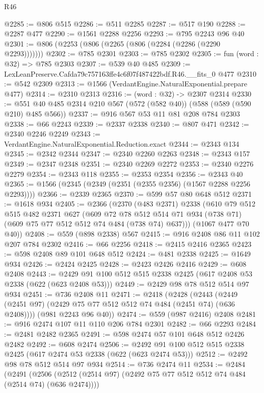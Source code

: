 \begin{lexlean}{R46}
\begin{coremodule}
@2285 := @806 @515
@2286 := @511 @2285
@2287 := @517 @190
@2288 := @2287 @477
@2290 := @1561 @2288 @2256
@2293 := @795 @2243 @96 @40
@2301 := @806 (@2253 (@806 (@2265 (@806 (@2284 (@2286 (@2290 @2293)))))))
@2302 := @785 @2301
@2303 := @785 @2302
@2305 := fun (word : @32) => @785 @2303
@2307 := @539 @40 @485
@2309 := LexLeanPreserve.Cafda79c757163ffe4c6f07f487422bdf.R46.__fits_0 @477
@2310 := @542 @2309
@2313 := @1566 (VerdantEngine.NaturalExponential.prepare @477)
@2314 := @2310 @2313
@2316 := (word : @32) -> @2307 @2314
@2330 := @551 @40 @485 @2314 @210 @567 (@572 (@582 @40)) (@588 (@589 (@590 @210) @485 @566))
@2337 := @916 @567 @53 @11 @81 @208 @784 @2303
@2338 := @66 @2243
@2339 := @2337 @2338
@2340 := @807 @471
@2342 := @2340 @2246 @2249
@2343 := VerdantEngine.NaturalExponential.Reduction.exact
@2344 := @2343 @134
@2345 := @2342 @2344
@2347 := @2340 @2260 @2263
@2348 := @2343 @157
@2349 := @2347 @2348
@2351 := @2340 @2269 @2272
@2353 := @2340 @2276 @2279
@2354 := @2343 @118
@2355 := @2353 @2354
@2356 := @2343 @40
@2365 := @1566 (@2345 (@2349 (@2351 (@2355 @2356) (@1567 @2288 @2256 @2293))))
@2366 := @2339 @2365
@2370 := @599 @57 @80 @648 @512
@2371 := @1618 @934
@2405 := @2366
    (@2370
      (@483 @2371)
      @2338
      (@610
        @79
        @512
        @515
        @482
        @2371
        @627
        (@609
          @72
          @78
          @512
          @514
          @71
          @934
          (@738 @71)
          (@609 @75 @77 @512 @512 @74 @484 (@738 @74) @637)))
      (@1067 @477 @70 @40))
@2408 := @559 (@898 @2338) @567
@2415 := @916 @2408 @86 @11 @102 @207 @784 @2302
@2416 := @66 @2256
@2418 := @2415 @2416 @2365
@2423 := @598 @2408 @89 @101 @648 @512
@2424 := @481 @2338
@2425 := @1649 @934
@2426 := @2424 @2425
@2428 := @2423 @2426 @2416
@2429 := @608 @2408
@2443 := @2429 @91 @100 @512 @515 @2338 @2425 (@617 @2408 @53 @2338 (@622 (@623 @2408 @53)))
@2449 := @2429 @98 @78 @512 @514 @97 @934
@2451 := @736 @2408 @11
@2471 := @2418
    (@2428
      (@2443 (@2449 (@2451 @97) (@2429 @75 @77 @512 @512 @74 @484 (@2451 @74) (@636 @2408))))
      (@981 @2243 @96 @40))
@2474 := @559 (@987 @2416) @2408
@2481 := @916 @2474 @107 @11 @110 @206 @784 @2301
@2482 := @66 @2293
@2484 := @2481 @2482 @2365
@2491 := @598 @2474 @57 @101 @648 @512 @2426 @2482
@2492 := @608 @2474
@2506 := @2492 @91 @100 @512 @515 @2338 @2425 (@617 @2474 @53 @2338 (@622 (@623 @2474 @53)))
@2512 := @2492 @98 @78 @512 @514 @97 @934
@2514 := @736 @2474 @11
@2534 := @2484
    (@2491
      (@2506 (@2512 (@2514 @97) (@2492 @75 @77 @512 @512 @74 @484 (@2514 @74) (@636 @2474))))

\end{coremodule}
\end{lexlean}
